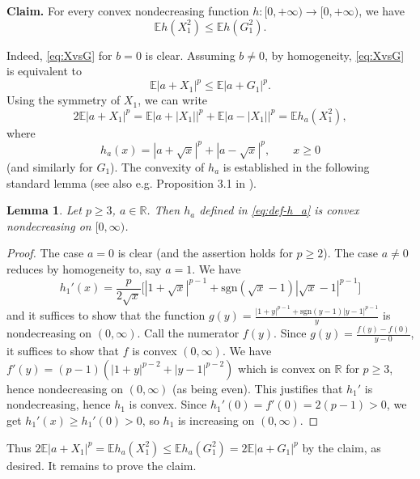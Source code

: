 \documentclass[10pt]{article}
\newcommand{\E}{\mathbb{E}}
\newcommand{\1}{\textbf{1}}
\newcommand{\R}{\mathbb{R}}
\newtheorem{lemma}[theorem]{Lemma}
\theoremstyle{remark}
\theoremstyle{definition}
\begin{document}
\bigskip
\noindent\textbf{Claim.} For every convex nondecreasing function $h\colon [0,+\infty)\to [0,+\infty)$, we have 
\begin{equation}\label{eq:X^2vsG^2}
\E h(X_1^2) \leq \E h(G_1^2).
\end{equation}

\noindent
Indeed, \eqref{eq:XvsG} for $b = 0$ is clear. Assuming $b \neq 0$, by homogeneity, \eqref{eq:XvsG} is equivalent to
\[
\E|a+X_1|^p \leq \E|a+G_1|^p.
\]
Using the symmetry of $X_1$, we can write
\[
2\E|a+X_1|^p = \E|a + |X_1||^p + \E|a-|X_1||^p = \E h_a(X_1^2),
\]
where
\begin{equation}\label{eq:def-h_a}
h_a(x) = |a + \sqrt{x}|^p + |a - \sqrt{x}|^p, \qquad x \geq 0
\end{equation}
(and similarly for $G_1$). The convexity of $h_a$ is established in the following standard lemma (see also e.g. Proposition 3.1 in \cite{FHJSZ}).

\begin{lemma}\label{lm:h_a-convex}
Let $p \geq 3$, $a \in \R$. Then $h_a$ defined in \eqref{eq:def-h_a} is convex nondecreasing on $[0,\infty)$.
\end{lemma}
\begin{proof}
The case $a = 0$ is clear (and the assertion holds for $p \geq 2$). The case $a \neq 0$ reduces by homogeneity to, say $a = 1$. We have
\[
h_1'(x) = \frac{p}{2\sqrt{x}}\Big[|1+\sqrt{x}|^{p-1}+\text{sgn}(\sqrt{x}-1)|\sqrt{x}-1|^{p-1}\Big]
\]
and it suffices to show that the function $g(y) = \frac{|1+y|^{p-1}+\text{sgn}(y-1)|y-1|^{p-1}}{y}$ is nondecreasing on $(0,\infty)$. Call the numerator $f(y)$. Since $g(y) = \frac{f(y) - f(0)}{y-0}$, it suffices to show that $f$ is convex $(0,\infty)$. We have $f'(y) = (p-1)(|1+y|^{p-2}+|y-1|^{p-2})$ which is convex on $\R$ for $p \geq 3$, hence nondecreasing on $(0,\infty)$ (as being even). This justifies that $h_1'$ is nondecreasing, hence $h_1$ is convex. Since $h_1'(0) = f'(0) = 2(p-1) > 0$, we get $h_1'(x) \geq h_1'(0) > 0$, so $h_1$ is increasing on $(0,\infty)$.
\end{proof}

Thus $2\E|a+X_1|^p = \E h_a(X_1^2) \leq \E h_a(G_1^2) = 2\E|a+G_1|^p$ by the claim, as desired. It remains to prove the claim.
\end{document}
